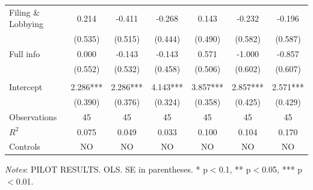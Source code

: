 \documentclass[11pt]{article}
\begin{document}
\begin{landscape}
\begin{table}[!htbp]
\begin{threeparttable}
\begin{tabular}{l|cccccc}
Filing \& Lobbying & 0.214 & -0.411 & -0.268 & 0.143 & -0.232 & -0.196 \\
 & (0.535) & (0.515) & (0.444) & (0.490) & (0.582) & (0.587) \\
Full info & 0.000 & -0.143 & -0.143 & 0.571 & -1.000 & -0.857 \\
 & (0.552) & (0.532) & (0.458) & (0.506) & (0.602) & (0.607) \\
\\[0.5em]
Intercept & 2.286*** & 2.286*** & 4.143*** & 3.857*** & 2.857*** & 2.571*** \\
 & (0.390) & (0.376) & (0.324) & (0.358) & (0.425) & (0.429) \\
\midrule
Observations & 45 & 45 & 45 & 45 & 45 & 45 \\
$R^2$ & 0.075 & 0.049 & 0.033 & 0.100 & 0.104 & 0.170 \\
Controls & NO & NO & NO & NO & NO & NO \\
\bottomrule
\end{tabular}
\begin{tablenotes}[flushleft]
\footnotesize
\item \textit{Notes}: PILOT RESULTS. OLS. SE in parentheses. * p$<$0.1, ** p$<$0.05, *** p$<$0.01.
\end{tablenotes}
\end{threeparttable}
\end{table}
\end{landscape}
\FloatBarrier
\end{document}
